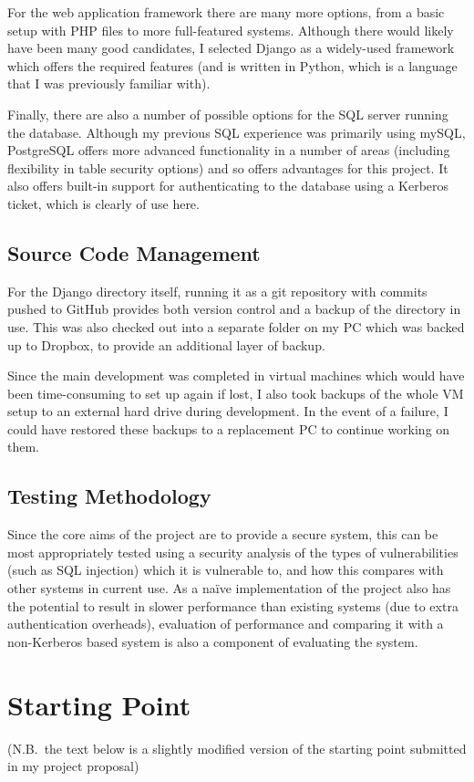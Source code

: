 \documentclass{report}
\begin{document}
For the web application framework there are many more options, from a basic setup with PHP files to more full-featured systems. Although there would likely have been many good candidates, I selected Django as a widely-used framework which offers the required features (and is written in Python, which is a language that I was previously familiar with).

Finally, there are also a number of possible options for the SQL server running the database. Although my previous SQL experience was primarily using mySQL, PostgreSQL offers more advanced functionality in a number of areas (including flexibility in table security options) and so offers advantages for this project. It also offers built-in support for authenticating to the database using a Kerberos ticket, which is clearly of use here.

\subsection{Source Code Management}
For the Django directory itself, running it as a git repository with commits pushed to GitHub provides both version control and a backup of the directory in use. This was also checked out into a separate folder on my PC which was backed up to Dropbox, to provide an additional layer of backup.

Since the main development was completed in virtual machines which would have been time-consuming to set up again if lost, I also took backups of the whole VM setup to an external hard drive during development. In the event of a failure, I could have restored these backups to a replacement PC to continue working on them.

\subsection{Testing Methodology}
Since the core aims of the project are to provide a secure system, this can be most appropriately tested using a security analysis of the types of vulnerabilities (such as SQL injection) which it is vulnerable to, and how this compares with other systems in current use. As a na\"ive implementation of the project also has the potential to result in slower performance than existing systems (due to extra authentication overheads), evaluation of performance and comparing it with a non-Kerberos based system is also a component of evaluating the system.

\section{Starting Point}
(N.B.\ the text below is a slightly modified version of the starting point submitted in my project proposal)
\end{document}

